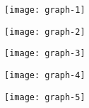 \begin{frame}{}
\texttt{[image: graph-1]}
\end{frame}
\begin{frame}{}
\texttt{[image: graph-2]}
\end{frame}
\begin{frame}{}
\texttt{[image: graph-3]}
\end{frame}
\begin{frame}{}
\texttt{[image: graph-4]}
\end{frame}
\begin{frame}{}
\texttt{[image: graph-5]}
\end{frame}
